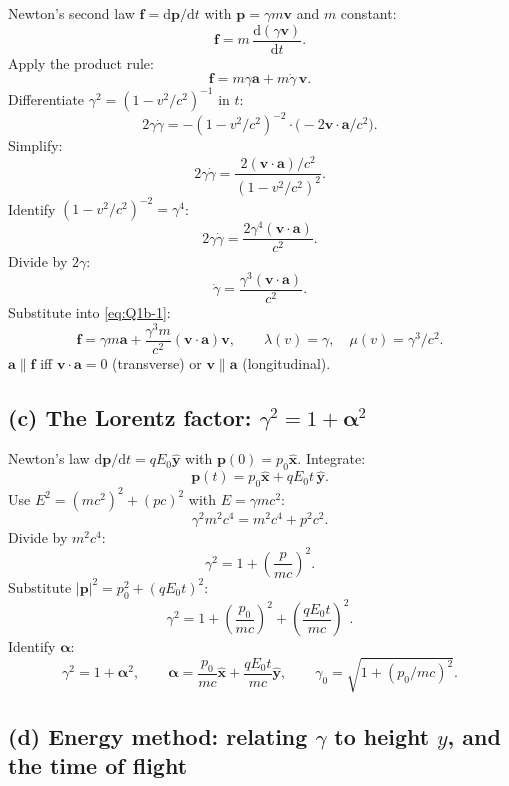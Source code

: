 \documentclass[11pt]{article}
\newcommand{\de}{\mathrm{d}}
\begin{document}
Newton's second law $\bm f = \de\bm p/\de t$ with $\bm p=\gamma m\bm v$ and $m$ constant:
\[ \bm f = m\,\frac{\de(\gamma\bm v)}{\de t}. \]
Apply the product rule:
\begin{equation}
\bm f = m\gamma\bm a + m\dot\gamma\,\bm v.
\label{eq:Q1b-1}
\end{equation}
Differentiate $\gamma^2 = (1-v^2/c^2)^{-1}$ in $t$:
\[ 2\gamma\dot\gamma = -(1-v^2/c^2)^{-2}\cdot\bigl(-2\bm v\cdot\bm a/c^2\bigr). \]
Simplify:
\[ 2\gamma\dot\gamma = \frac{2(\bm v\cdot\bm a)/c^2}{(1-v^2/c^2)^2}. \]
Identify $(1-v^2/c^2)^{-2}=\gamma^4$:
\[ 2\gamma\dot\gamma = \frac{2\gamma^4(\bm v\cdot\bm a)}{c^2}. \]
Divide by $2\gamma$:
\[ \dot\gamma = \frac{\gamma^3(\bm v\cdot\bm a)}{c^2}. \]
Substitute into \eqref{eq:Q1b-1}:
\begin{equation}
\boxed{\bm f = \gamma m \bm a + \frac{\gamma^3 m}{c^2}(\bm v\cdot\bm a)\bm v,\qquad \lambda(v)=\gamma,\quad \mu(v)=\gamma^3/c^2.}
\label{eq:Q1b-3}
\end{equation}
$\bm a\parallel\bm f$ iff $\bm v\cdot\bm a=0$ (transverse) or $\bm v\parallel\bm a$ (longitudinal).

\subsection*{(c) The Lorentz factor: $\gamma^2 = 1+\bm\alpha^2$}

Newton's law $\de\bm p/\de t = qE_0\hat{\bm y}$ with $\bm p(0) = p_0\hat{\bm x}$. Integrate:
\[ \bm p(t) = p_0\hat{\bm x} + qE_0 t\,\hat{\bm y}. \]
Use $E^2 = (mc^2)^2 + (pc)^2$ with $E = \gamma mc^2$:
\[ \gamma^2 m^2 c^4 = m^2 c^4 + p^2 c^2. \]
Divide by $m^2 c^4$:
\[ \gamma^2 = 1+\left(\frac{p}{mc}\right)^2. \]
Substitute $|\bm p|^2 = p_0^2 + (qE_0 t)^2$:
\[ \gamma^2 = 1 + \left(\frac{p_0}{mc}\right)^2 + \left(\frac{qE_0 t}{mc}\right)^2. \]
Identify $\bm\alpha$:
\begin{equation}
\gamma^2 = 1 + \bm\alpha^2,\qquad
\boxed{\bm\alpha = \frac{p_0}{mc}\hat{\bm x} + \frac{qE_0 t}{mc}\hat{\bm y},}\qquad \gamma_0=\sqrt{1+(p_0/mc)^2}.
\label{eq:Q1c-2}
\end{equation}

\subsection*{(d) Energy method: relating $\gamma$ to height $y$, and the time of flight}
\end{document}

